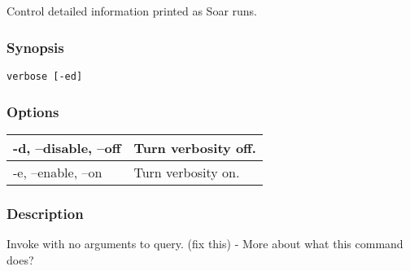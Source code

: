 \subsection{}
\label{verbose}
Control detailed information printed as Soar runs. 
\subsubsection*{Synopsis}
\begin{verbatim}
verbose [-ed]
\end{verbatim}
\subsubsection*{Options}
\begin{tabular}{|l|l|}
\hline 
 -d, --disable, --off  & Turn verbosity off.  \\
 \hline 
 -e, --enable, --on  & Turn verbosity on.  \\
 \hline 
\end{tabular}
\subsubsection*{Description}
 Invoke with no arguments to query. (fix this) - More about what this command does? 
